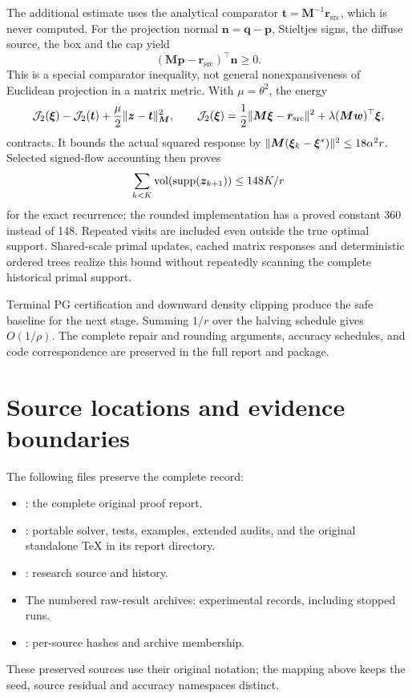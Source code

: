 \documentclass[11pt]{article}
\begin{document}
The additional estimate uses the analytical comparator
$\bm{t}=\bm{M}^{-1}\bm{r}_{\mathrm{src}}$, which is never computed.
For the projection normal $\bm{n}=\bm{q}-\bm{p}$, Stieltjes signs,
the diffuse source, the box and the cap yield
\[
 (\bm{M}\bm{p}-\bm{r}_{\mathrm{src}})^{\top}\bm{n}\geq0.
\]
This is a special comparator inequality, not general nonexpansiveness of
Euclidean projection in a matrix metric. With $\mu=\theta^2$, the energy
\[
 \mathcal J_2(\bm{\xi})-\mathcal J_2(\bm{t})
       +\frac\mu2\lVert\bm{z}-\bm{t}\rVert_{\bm{M}}^2,\qquad
 \mathcal J_2(\bm{\xi})=\frac12\lVert\bm{M}\bm{\xi}-\bm{r}_{\mathrm{src}}\rVert^2
              +\lambda(\bm{M}\bm{w})^{\top}\bm{\xi},
\]
contracts. It bounds the actual squared response by
$\lVert\bm{M}(\bm{\xi}_k-\bm{\xi}^*)\rVert^2\leq18\alpha^2r$.
Selected signed-flow accounting then proves
\[
 \sum_{k<K}\operatorname{vol}(\operatorname{supp}(\bm{z}_{k+1}))\leq148K/r
\]
for the exact recurrence; the rounded implementation has a proved constant
360 instead of 148. Repeated visits are included even outside the true
optimal support. Shared-scale primal updates, cached matrix responses and
deterministic ordered trees realize this bound without repeatedly scanning
the complete historical primal support.

Terminal PG certification and downward density clipping produce the safe
baseline for the next stage. Summing $1/r$ over the halving schedule gives
$O(1/\rho)$. The complete repair and rounding arguments, accuracy schedules,
and code correspondence are preserved in the full report and package.






\section{Source locations and evidence boundaries}
\label{sec:archive-locations}
The following files preserve the complete record:
\begin{itemize}[nosep]
\item {}: the complete original proof report.
\item {}: portable solver, tests, examples,
extended audits, and the original standalone TeX in its report directory.
\item {}: research source and history.
\item The numbered raw-result archives: experimental records, including
stopped runs.
\item {}: per-source hashes and archive membership.
\end{itemize}
These preserved sources use their original notation; the mapping above
keeps the seed, source residual and accuracy namespaces distinct.
\end{document}
